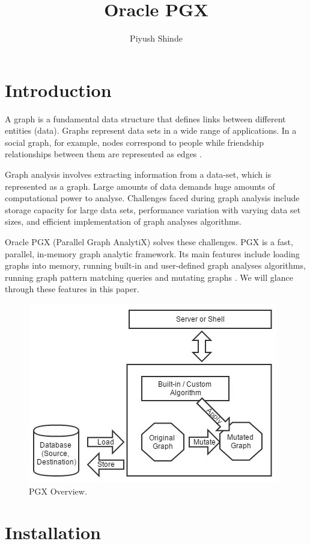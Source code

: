 \documentclass[9pt,twocolumn,twoside]{../../styles/osajnl}
\title{Oracle PGX}
\author[1,*]{Piyush Shinde}
\affil[1]{School of Informatics and Computing, Bloomington, IN 47408,
  U.S.A.}
\affil[*]{Corresponding authors: piyushsshinde1992@gmail.com}
\begin{document}
\maketitle

\section{Introduction}

A graph is a fundamental data structure that defines links between
different entities (data). Graphs represent data sets in a wide range
of applications. In a social graph, for example, nodes correspond to
people while friendship relationships between them are represented as
edges \cite{hong2012green}.

Graph analysis involves extracting information from a data-set, which
is represented as a graph. Large amounts of data demands huge amounts
of computational power to analyse. Challenges faced during graph
analysis include storage capacity for large data sets, performance
variation with varying data set sizes, and efficient implementation of
graph analyses algorithms.

Oracle PGX (Parallel Graph AnalytiX) solves these challenges.  PGX is
a fast, parallel, in-memory graph analytic framework. Its main
features include loading graphs into memory, running built-in and
user-defined graph analyses algorithms, running graph pattern matching
queries and mutating graphs \cite{www-over}. We will glance through
these features in this paper.

\begin{figure}[h]
    \centering \includegraphics[scale=0.7]{images/1} \centering
    \caption{PGX Overview.}
    \end{figure}

\section{Installation}
\end{document}
